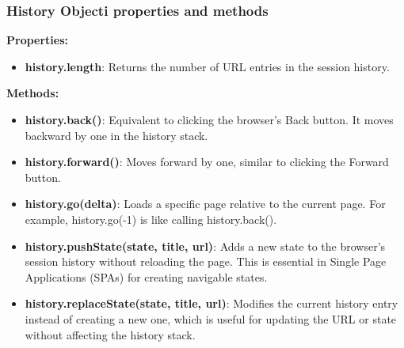 \documentclass{report}
\begin{document}
    \subsubsection{History Objecti properties and methods}
    \bigbreak \noindent 
    \textbf{Properties:}
    \begin{itemize}
        \item \textbf{history.length}: Returns the number of URL entries in the session history.
    \end{itemize}
    \bigbreak \noindent 
    \textbf{Methods:}
    \begin{itemize}
        \item \textbf{history.back()}: Equivalent to clicking the browser’s Back button. It moves backward by one in the history stack.
        \item \textbf{history.forward()}: Moves forward by one, similar to clicking the Forward button.
        \item \textbf{history.go(delta)}: Loads a specific page relative to the current page. For example, history.go(-1) is like calling history.back().
        \item \textbf{history.pushState(state, title, url)}: Adds a new state to the browser’s session history without reloading the page. This is essential in Single Page Applications (SPAs) for creating navigable states.
        \item \textbf{history.replaceState(state, title, url)}: Modifies the current history entry instead of creating a new one, which is useful for updating the URL or state without affecting the history stack.
    \end{itemize}

    \bigbreak \noindent 
\end{document}
